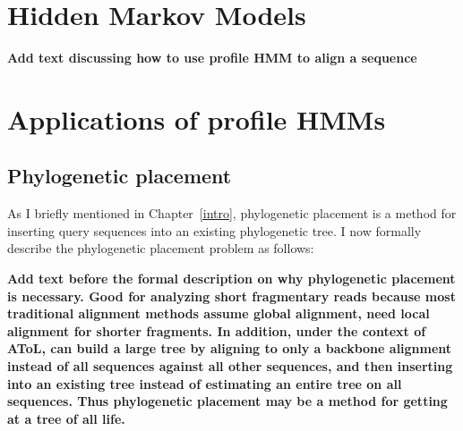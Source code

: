 \section{Hidden Markov Models}\label{back:hmm}

\textbf{Add text discussing how to use profile HMM to align a sequence}
\section{Applications of profile HMMs}\label{back:app}
\subsection{Phylogenetic placement}
As I briefly mentioned in Chapter~\ref{intro}, phylogenetic placement is a method for inserting query sequences into an existing phylogenetic tree.  I now formally describe the phylogenetic placement problem as follows:

\textbf{Add text before the formal description on why phylogenetic placement is necessary.  Good for analyzing short fragmentary reads because most traditional alignment methods assume global alignment, need local alignment for shorter fragments.  In addition, under the context of AToL, can build a large tree by aligning to only a backbone alignment instead of all sequences against all other sequences, and then inserting into an existing tree instead of estimating an entire tree on all sequences.  Thus phylogenetic placement may be a method for getting at a tree of all life.}

